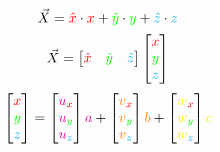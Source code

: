 \documentclass[preview]{standalone}
\begin{document}
$$\vec{X} = \textcolor{red}{\hat{x}}\cdot \textcolor{red}{x} + \textcolor{green}{\hat{y}}\cdot \textcolor{green}{y} + \textcolor{cyan}{\hat{z}}\cdot \textcolor{cyan}{z}$$
$$\vec{X} = \begin{bmatrix}\textcolor{red}{\hat{x}}&\textcolor{green}{\hat{y}}&\textcolor{cyan}{\hat{z}}\end{bmatrix}\begin{bmatrix}\textcolor{red}{x}\\\textcolor{green}{y}\\\textcolor{cyan}{z}\end{bmatrix}$$
$$\begin{bmatrix}\textcolor{red}{x}\\\textcolor{green}{y}\\\textcolor{cyan}{z}\end{bmatrix} =
\begin{bmatrix}\textcolor{magenta}{u}_{\textcolor{red}{x}}\\\textcolor{magenta}{u}_{\textcolor{green}{y}}\\\textcolor{magenta}{u}_{\textcolor{cyan}{z}}\end{bmatrix}\textcolor{magenta}{a} +
\begin{bmatrix}\textcolor{orange}{v}_{\textcolor{red}{x}}\\\textcolor{orange}{v}_{\textcolor{green}{y}}\\\textcolor{orange}{v}_{\textcolor{cyan}{z}}\end{bmatrix}\textcolor{orange}{b} +
\begin{bmatrix}\textcolor{yellow}{w}_{\textcolor{red}{x}}\\\textcolor{yellow}{w}_{\textcolor{green}{y}}\\\textcolor{yellow}{w}_{\textcolor{cyan}{z}}\end{bmatrix}\textcolor{yellow}{c}$$
\end{document}
